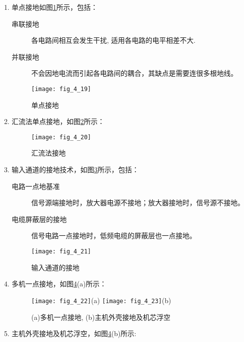 \begin{enumerate}



\item 单点接地如图\ref{fig_4_19}所示，包括：

\begin{description}
    \item[串联接地] 各电路间相互会发生干扰, 适用各电路的电平相差不大.
    \item[并联接地] 不会因地电流而引起各电路间的耦合，其缺点是需要连很多根地线。
\end{description}


\begin{figure}[h]
  \centering
  \texttt{[image: fig\_4\_19]}\\
  \caption{单点接地}\label{fig_4_19}
\end{figure}


\item 汇流法单点接地，如图\ref{fig_4_20}所示：


\begin{figure}[h]
  \centering
  \texttt{[image: fig\_4\_20]}\\
  \caption{汇流法接地}\label{fig_4_20}
\end{figure}



\item 输入通道的接地技术，如图\ref{fig_4_21}所示，包括：

\begin{description}
  \item[电路一点地基准]
信号源端接地时，放大器电源不接地；放大器接地时，信号源不接地。
  \item[电缆屏蔽层的接地] 信号电路一点接地时，低频电缆的屏蔽层也一点接地。
\end{description}


\begin{figure}[h]
  \centering
  \texttt{[image: fig\_4\_21]}\\
  \caption{输入通道的接地}\label{fig_4_21}
\end{figure}

\item 多机一点接地，如图\ref{fig_4_22}(a)所示：

\begin{figure}[h]
  \centering
  \texttt{[image: fig\_4\_22]}(a)
  \texttt{[image: fig\_4\_23]}(b)\\
  \caption{(a)多机一点接地, (b)主机外壳接地及机芯浮空}\label{fig_4_22}
\end{figure}



\item 主机外壳接地及机芯浮空，如图\ref{fig_4_22}(b)所示:



\end{enumerate}


